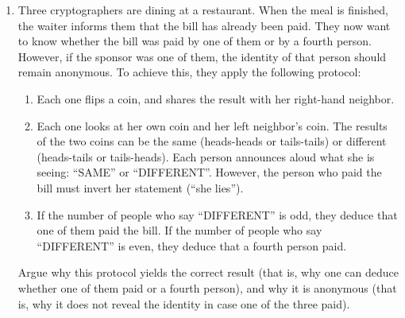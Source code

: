 \begin{enumerate}

\item \strhard
Three cryptographers are dining at a restaurant.
When the meal is finished, the waiter informs them that the bill has already been paid.
They now want to know whether the bill was paid by one of them or by a fourth person.
However,
if the sponsor was one of them,
the identity of that person should remain anonymous.
To achieve this, they apply the following protocol:

\begin{enumerate}[{Step }1]
\item
Each one flips a coin, and shares
the result with her right-hand neighbor.
\item
Each one looks at her own coin and her left neighbor's coin.
The results of the two coins can be the same
(heads-heads or tails-tails) or different (heads-tails or tails-heads).
Each person announces aloud what she is seeing:
``SAME'' or ``DIFFERENT''.
However, the person who paid the bill must invert her statement
(``she lies''). \item If the number of people who say ``DIFFERENT'' is odd,
they deduce that one of them paid the bill.
If the number of people who say ``DIFFERENT'' is even,
they deduce that a fourth person paid.
\end{enumerate}

Argue why this protocol yields the correct result
(that is, why one can deduce whether one of them paid or a fourth person),
and why it is anonymous (that is, why it does not reveal the identity in case one of the three paid).

\end{enumerate}
